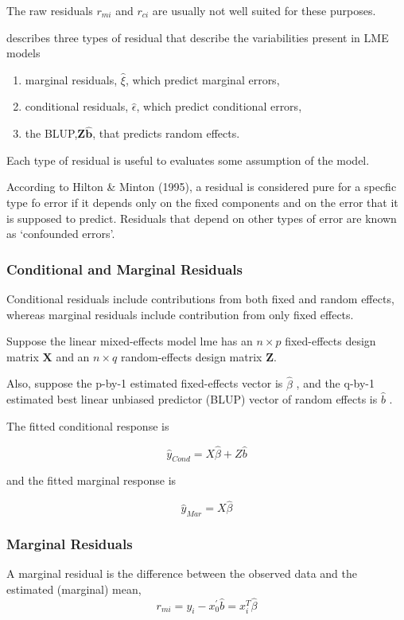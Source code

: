 \documentclass[12pt, a4paper]{report}
\theoremstyle{plain}
\theoremstyle{definition}
\theoremstyle{remark}
\begin{document}
	The raw residuals $r_{mi}$ and $r_{ci}$ are usually not well suited for these purposes.
	

\citet{PB} describes three types of residual that describe the variabilities
	present in LME models
	\begin{enumerate}
		\item marginal residuals, $\hat{\xi}$, which predict marginal errors,
		\item conditional residuals, $\hat{\epsilon}$, which predict conditional errors,
		\item the BLUP,$\boldsymbol{Z\hat{b}}$, that predicts random effects.
	\end{enumerate}
	Each type of residual is useful to evaluates some assumption of the model.
	
	
	According to Hilton \& Minton (1995), a residual is considered pure for a specfic type fo error
	if it depends only on the fixed components and on the error that it is supposed to predict.
	Residuals that depend on other types of error are known as `confounded errors'.
	
	
	
	
	\subsubsection{Conditional and Marginal Residuals}
	Conditional residuals include contributions from both fixed and random effects, whereas marginal residuals include contribution from only fixed effects.
	
	Suppose the linear mixed-effects model lme has an $n \times p$ fixed-effects design matrix $\boldsymbol{X}$ and an $n \times q$ random-effects design matrix $\boldsymbol{Z}$. 
	
	Also, suppose the p-by-1 estimated fixed-effects vector is $\hat{\beta}$ , and the q-by-1 estimated best linear unbiased predictor (BLUP) 
	vector of random effects is $\hat{b}$ . 
	
The fitted conditional response is
	
	\[ \hat{y}_{Cond} = X \hat{\beta} + Z \hat{b} \]
	
	and the fitted marginal response is
	
	
	\[ \hat{y}_{Mar} = X \hat{\beta} \]
	
	\subsubsection{Marginal Residuals}
	A marginal residual is the difference between the observed data and the estimated (marginal) mean, 
	\[r_{mi} = y_i - x_0^{\prime} \hat{b} =x^{T}_{i}\hat{\beta}\]
	
\end{document}
